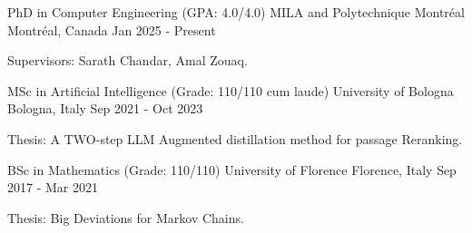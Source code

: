 

\begin{cventries}

 

 
    \cventry
    {PhD in Computer Engineering (GPA: 4.0/4.0)} %
    {MILA and Polytechnique Montréal} %
    {Montréal, Canada} %
    {Jan 2025 - Present} %
    {
      \begin{cvitems} %
        \item {Supervisors: Sarath Chandar, Amal Zouaq.}
      \end{cvitems}
    }
    
    \cventry
    {MSc in Artificial Intelligence (Grade: 110/110 cum laude)} %
    {University of Bologna} %
    {Bologna, Italy} %
    {Sep 2021 - Oct 2023} %
    {
      \begin{cvitems} %
        \item {Thesis: A TWO-step LLM Augmented distillation method for passage Reranking. \quad {}}
      \end{cvitems}
    }
    
  \cventry
    {BSc in Mathematics (Grade: 110/110)} %
    {University of Florence} %
    {Florence, Italy} %
    {Sep 2017 - Mar 2021} %
    {
      \begin{cvitems} %
        \item {Thesis: Big Deviations for Markov Chains. \quad {}}
      \end{cvitems}
    }
    

\end{cventries}
